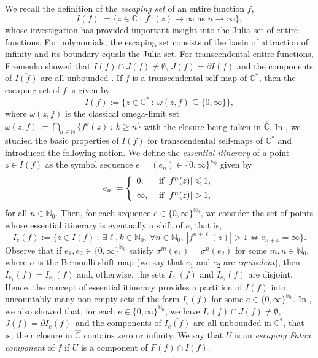 \documentclass[a4paper, 12pt, reqno]{amsart}
\numberwithin{equation}{section}
\theoremstyle{plain}
\theoremstyle{definition}
\theoremstyle{remark}
\newcommand{\C}{{\mathbb{C}}}
\newcommand{\CR}{{\hat{\mathbb{C}}}}
\newcommand{\CS}{{\mathbb{C}^*}}
\newcommand{\N}{{\mathbb{N}}}
\begin{document}
We recall the definition of the \textit{escaping set} of an entire function $f$,
$$
I(f):=\{z\in\C\ :\ f^n(z)\rightarrow \infty \mbox{ as } n\rightarrow \infty\},
$$
whose investigation has provided important insight into the Julia set of entire functions. For polynomials, the escaping set consists of the basin of attraction of infinity and its boundary equals the Julia set. For transcendental entire functions, Eremenko showed that $I(f)\cap J(f)\neq \emptyset$, $J(f)=\partial I(f)$ and the components of $\overline{I(f)}$ are all unbounded \cite{eremenko89}. If $f$ is a transcendental self-map of $\C^*$, then the escaping set of $f$ is given by 
$$
I(f):=\{z\in\CS\ :\ \omega(z,f)\subseteq \{0,\infty\}\},
$$
where $\omega(z,f)$ is the classical omega-limit set $\omega(z,f):=\bigcap_{n\in\N}\overline{\{f^k(z)\ :\ k\geqslant n\}}$ with the closure being taken in $\CR$. In \cite{martipete1}, we studied the basic properties of $I(f)$ for transcendental self-maps of $\C^*$ and introduced the following notion. We define the \textit{essential itinerary} of a point $z\in I(f)$ as the symbol sequence \mbox{$e=(e_n)\in\{0,\infty\}^{\N_0}$} given by
$$
e_n:=\left\{
\begin{array}{ll}
0, & \mbox{ if } |f^n(z)|\leqslant 1,\vspace{5pt}\\
\infty, & \mbox{ if } |f^n(z)|>1,
\end{array}
\right.
$$
for all $n\in \N_0$. Then, for each sequence $e\in\{0,\infty\}^{\N_0}$, we consider the set of points whose essential itinerary is eventually a shift of $e$, that is,
$$
I_e(f):=\{z\in I(f)\ :\ \exists \ell,k\in\N_0,\ \forall n\in\mathbb{N}_0,\ |f^{n+\ell}(z)|>1\Leftrightarrow e_{n+k}=\infty\}.
$$
Observe that if $e_1,e_2\in\{0,\infty\}^{\N_0}$ satisfy $\sigma^m(e_1)=\sigma^n(e_2)$ for some $m,n\in\N_0$, where $\sigma$ is the Bernoulli shift  map (we say that $e_1$ and $e_2$ are \textit{equivalent}), then $I_{e_1}(f)=I_{e_2}(f)$ and, otherwise, the sets $I_{e_1}(f)$ and $I_{e_2}(f)$ are disjoint. Hence, the concept of essential itinerary provides a partition of $I(f)$ into uncountably many non-empty sets of the form $I_e(f)$ for some $e\in\{0,\infty\}^{\mathbb{N}_0}$. In \cite{martipete1}, we also showed that, for each $e\in\{0,\infty\}^{\N_0}$, we have $I_e(f)\cap J(f)\neq \emptyset$, $J(f)=\partial I_e(f)$~and the components of $\overline{I_e(f)}$ are all unbounded in $\C^*$, that is, their closure in $\CR$ contains zero or infinity. We say that $U$ is an \textit{escaping Fatou component} of $f$ if $U$ is a component of $F(f)\cap I(f)$.
\end{document}
